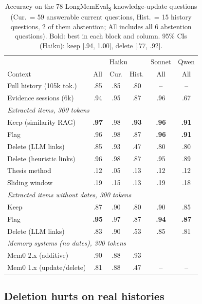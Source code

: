 \documentclass[11pt]{article}
\begin{document}
\begin{table}[t]
\centering
\small
\setlength{\tabcolsep}{3.2pt}
\begin{tabular}{lccc|cc}
\toprule
 & \multicolumn{3}{c|}{Haiku} & Sonnet & Qwen \\
Context & All & Cur. & Hist. & All & All \\
\midrule
Full history (105k tok.) & .85 & .85 & .80 & -- & -- \\
Evidence sessions (6k) & .94 & .95 & .87 & .96 & .67 \\
\midrule
\multicolumn{6}{l}{\emph{Extracted items, 300 tokens}} \\
Keep (similarity RAG) & \textbf{.97} & .98 & \textbf{.93} & \textbf{.96} & \textbf{.91} \\
Flag & .96 & .98 & .87 & \textbf{.96} & \textbf{.91} \\
Delete (LLM links) & .85 & .93 & .47 & .80 & .80 \\
Delete (heuristic links) & .96 & .98 & .87 & .95 & .89 \\
Thesis method & .12 & .05 & .13 & .12 & .12 \\
Sliding window & .19 & .15 & .13 & .19 & .18 \\
\midrule
\multicolumn{6}{l}{\emph{Extracted items without dates, 300 tokens}} \\
Keep & .87 & .90 & .80 & .90 & .85 \\
Flag & \textbf{.95} & .97 & .87 & \textbf{.94} & \textbf{.87} \\
Delete (LLM links) & .83 & .90 & .53 & .85 & .81 \\
\midrule
\multicolumn{6}{l}{\emph{Memory systems (no dates), 300 tokens}} \\
Mem0 2.x (additive) & .90 & .88 & .93 & -- & -- \\
Mem0 1.x (update/delete) & .81 & .88 & .47 & -- & -- \\
\bottomrule
\end{tabular}
\caption{Accuracy on the 78 LongMemEval\textsubscript{S} knowledge-update questions (Cur.\ = 59 answerable
current questions, Hist.\ = 15 history questions, 2 of them abstention; All includes all 6
abstention questions). Bold: best in each block and column. 95\% CIs
(Haiku): keep [.94, 1.00], delete [.77, .92].}
\label{tab:ku}
\end{table}

\subsection{Deletion hurts on real histories}
\label{sec:ku}
\end{document}
